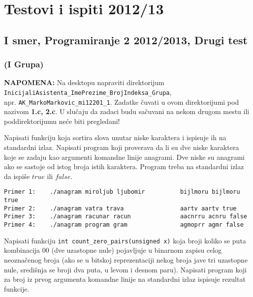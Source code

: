 \chapter{Testovi i ispiti 2012/13}

\newpage


\section{I smer, Programiranje 2 2012/2013, Drugi test}
\subsection{(I Grupa)}

\textbf{NAPOMENA:} Na desktopu napraviti direktorijum
\verb|InicijaliAsistenta_ImePrezime_BrojIndeksa_Grupa|,
\\ npr. \verb|AK_MarkoMarkovic_mi12201_1|. Zadatke \v cuvati u ovom
direktorijumi pod nazivom \textbf{1.c, 2.c}.  U slu\v caju da zadaci
budu sa\v cuvani na nekom drugom mestu ili poddirektorijumu ne\'ce
biti pregledani!

\begin{z} Napisati funkciju koja sortira slova unutar niske karaktera i
  ispisuje ih na standardni izlaz. Napisati program koji proverava da
  li su dve niske karaktera koje se zadaju kao argumenti komandne
  linije anagrami. Dve niske su anagrami ako se sastoje od istog broja
  istih karaktera. Program treba na standardni izlaz da ispi\v se
  $true$ ili $false$.
\end{z}

\begin{verbatim}
Primer 1:    ./anagram miroljub ljubomir          bijlmoru bijlmoru true
Primer 2:    ./anagram vatra trava                aartv aartv true
Primer 3:    ./anagram racunar racun              aacnrru acnru false
Primer 4:    ./anagram program gram               agmoprr agmr false
\end{verbatim}

\begin{z} Napisati funkciju
  \verb|int count_zero_pairs(unsigned x)| koja broji koliko se puta
  kombinacija $00$ (dve uzastopne nule) pojavljuje u binarnom zapisu
  celog neozna\v cenog broja (ako se u bitskoj reprezentaciji nekog
  broja jave tri uzastopne nule, sredi\v snja se broji dva puta, u
  levom i desnom paru). Napisati program koji za broj iz prvog
  argumenta komandne linije na standardni izlaz ispisuje rezultat
  funkcije.
\end{z}

